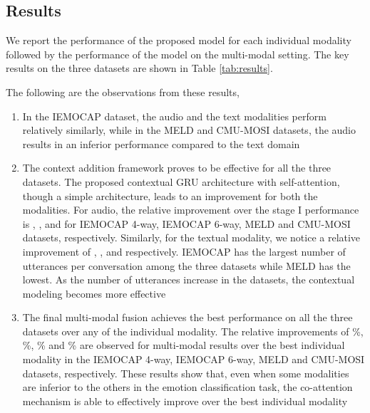 \documentclass[lettersize,journal]{IEEEtran}
\begin{document}
\subsection{Results}
We report the performance of the proposed model for each individual modality followed by the performance of the model on the multi-modal setting.  The key results on the three datasets are shown in Table \ref{tab:results}. 

The following are the observations from these results, 
\begin{enumerate}[label=(\roman*)] 
    \item In the IEMOCAP dataset, the audio and the text modalities perform relatively similarly, while in the MELD and CMU-MOSI datasets, the audio results in an inferior performance compared to the text domain
\item The context addition framework proves to be effective for all the three datasets. The proposed contextual GRU architecture with self-attention, though a simple architecture, leads to an improvement for both the modalities. For audio, the relative improvement over the stage I performance is , ,  and  for IEMOCAP 4-way, IEMOCAP 6-way, MELD and CMU-MOSI datasets, respectively. Similarly, for the textual modality, we notice a relative improvement of , ,  and  respectively. IEMOCAP has the largest number of utterances per conversation among the three datasets while MELD has the lowest. As the number of utterances increase in the datasets, the contextual modeling becomes more effective
    \item The final multi-modal fusion achieves the best performance on all the three datasets over any of the individual modality. The relative improvements of \%, \%, \% and \% are observed for multi-modal results over the best individual modality in the IEMOCAP 4-way, IEMOCAP 6-way, MELD and CMU-MOSI datasets, respectively. These results show that, even when some modalities are inferior to the others in the emotion classification task, the co-attention mechanism is able to effectively improve over the best individual modality
\end{enumerate}
\end{document}
